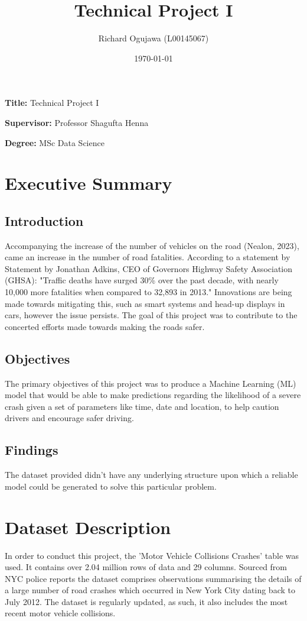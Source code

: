 \documentclass[12pt, a4paper, twocolumn]{article}
\title{\textbf{Technical Project I}}
\author{Richard Ogujawa (L00145067)}
\date{\today}
\newcommand{\namelistlabel}[1]{\mbox{#1}\hfil}
\newenvironment{namelist}[1]{%
\begin{list}{}
    {
        \let\makelabel\namelistlabel
        \settowidth{\labelwidth}{#1}
        \setlength{\leftmargin}{1.1\labelwidth}
    }
  }{%
\end{list}}
\begin{document}
\maketitle

\begin{namelist}{}
\item[{\bf Title:}]
	Technical Project I
\item[{\bf Supervisor:}]
	Professor Shagufta Henna 
\item[{\bf Degree:}]
	MSc Data Science
\end{namelist}

\section{Executive Summary}

\subsection{Introduction}
Accompanying the increase of the number of vehicles on the road (Nealon, 2023), came an increase in the number of road fatalities. According to a statement by Statement by Jonathan Adkins, CEO of Governors Highway Safety Association (GHSA): "Traffic deaths have surged 30\% over the past decade, with nearly 10,000 more fatalities when compared to 32,893 in 2013." Innovations are being made towards mitigating this, such as smart systems and head-up displays in cars, however the issue persists. The goal of this project was to contribute to the concerted efforts made towards making the roads safer. 

\subsection{Objectives}
The primary objectives of this project was to produce a Machine Learning (ML) model that would be able to make predictions regarding the likelihood of a severe crash given a set of parameters like time, date and location, to help caution drivers and encourage safer driving.

\subsection{Findings}
The dataset provided didn't have any underlying structure upon which a reliable model could be generated to solve this particular problem. 

\section{Dataset Description}
In order to conduct this project, the 'Motor Vehicle Collisions Crashes' table was used. It contains over 2.04 million rows of data and 29 columns. Sourced from NYC police reports the dataset comprises observations summarising the details of a large number of road crashes which occurred in New York City dating back to July 2012. The dataset is regularly updated, as such, it also includes the most recent motor vehicle collisions.
\end{document}
